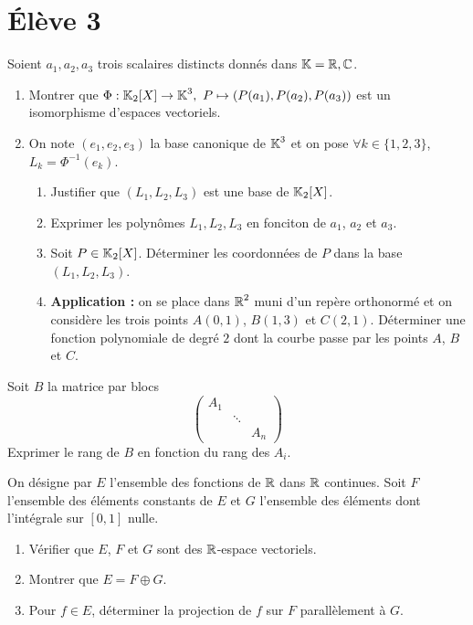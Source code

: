 \documentclass[9pt]{scrartcl}
\begin{document}
    \newpage
    \section*{Élève 3}
    \begin{ccp}
        Soient $a_1,a_2,a_3$ trois scalaires distincts donnés dans $\operatorname{\mathbb K}=\operatorname{\mathbb R},\operatorname{\mathbb C}$.
        \begin{enumerate}
            \item Montrer que $\Phi:\K_2[X]\to \K^3,\ P\mapsto \left(P(a_1),P(a_2),P(a_3)\right)$ est un isomorphisme d'espaces vectoriels.
            \item On note $(e_1,e_2,e_3)$ la base canonique de $\operatorname{\mathbb K}^3$ et on pose $\forall k\in\lbrace 1,2,3\rbrace$, $L_k=\Phi^{-1}(e_k)$.
            \begin{enumerate}
                \item Justifier que $(L_1,L_2,L_3)$ est une base de $\operatorname{\mathbb K}_2[X]$.
                \item Exprimer les polynômes $L_1,L_2,L_3$ en fonciton de $a_1$, $a_2$ et $a_3$.
                \item Soit $P\in\operatorname{\mathbb K}_2[X]$. Déterminer les coordonnées de $P$ dans la base $(L_1,L_2,L_3)$.
                \item \textbf{Application :} on se place dans $\operatorname{\mathbb R}^2$ muni d'un repère orthonormé et on considère les trois points $A(0,1)$, $B(1,3)$ et $C(2,1)$. 
                Déterminer une fonction polynomiale de degré $2$ dont la courbe passe par les points $A$, $B$ et $C$.
            \end{enumerate}
        \end{enumerate}
    \end{ccp}


    \begin{exo}
        Soit $B$ la matrice par blocs 
        \[
            \begin{pmatrix} A_1 & & \\ & \ddots & \\ & & A_n \end{pmatrix}
        \]
        Exprimer le rang de $B$ en fonction du rang des $A_i$.
    \end{exo}

    \begin{exo}
        On désigne par $E$ l'ensemble des fonctions de $\operatorname{\mathbb R}$ dans $\operatorname{\mathbb R}$ continues.
        Soit $F$ l'ensemble des éléments constants de $E$ et $G$ l'ensemble des éléments dont l'intégrale sur $[0,1]$ nulle.
        \begin{enumerate}
            \item Vérifier que $E$, $F$ et $G$ sont des $\operatorname{\mathbb R}$-espace vectoriels.
            \item Montrer que $E=F\oplus G$.
            \item Pour $f\in E$, déterminer la projection de $f$ sur $F$ parallèlement à $G$.
        \end{enumerate}
    \end{exo}


    
\end{document}
